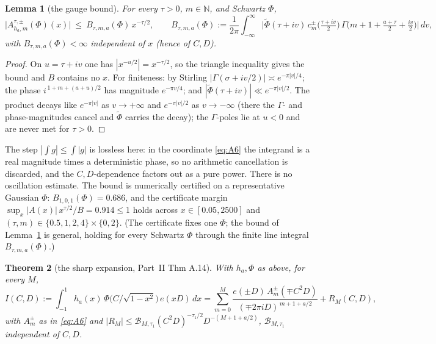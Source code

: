 \documentclass[11pt]{article}
\newtheorem{theorem}{Theorem}
\newtheorem{lemma}[theorem]{Lemma}
\theoremstyle{definition}
\newcommand{\wt}[1]{\widetilde{#1}}
\begin{document}
\begin{lemma}[the gauge bound]\label{lem:mag}
For every $\tau>0$, $m\in\mathbb N$, and Schwartz $\Phi$,
\[
  \big|A^{\tau,\pm}_{h_a,m}(\Phi)(x)\big|\ \le\ B_{\tau,m,a}(\Phi)\,x^{-\tau/2},
  \qquad
  B_{\tau,m,a}(\Phi):=\frac{1}{2\pi}\!\int_{-\infty}^{\infty}\!
     \Big|\wt\Phi(\tau+iv)\,c^\pm_m\!\big(\tfrac{\tau+iv}{2}\big)\,
     \Gamma\!\big(m{+}1{+}\tfrac{a+\tau}{2}{+}\tfrac{iv}{2}\big)\Big|\,dv,
\]
with $B_{\tau,m,a}(\Phi)<\infty$ \emph{independent of $x$} (hence of $C,D$).
\end{lemma}

\begin{proof}
On $u=\tau+iv$ one has $|x^{-u/2}|=x^{-\tau/2}$, so the triangle inequality gives the bound and $B$
contains no $x$. For finiteness: by Stirling $|\Gamma(\sigma+iv/2)|\asymp e^{-\pi|v|/4}$; the phase
$i^{\,1+m+(a+u)/2}$ has magnitude $e^{-\pi v/4}$; and $|\wt\Phi(\tau+iv)|\ll e^{-\pi|v|/2}$. The
product decays like $e^{-\pi|v|}$ as $v\to+\infty$ and $e^{-\pi|v|/2}$ as $v\to-\infty$ (there the
$\Gamma$- and phase-magnitudes cancel and $\wt\Phi$ carries the decay); the $\Gamma$-poles lie at
$u<0$ and are never met for $\tau>0$.
\end{proof}

The step $|\int g|\le\int|g|$ is lossless here: in the coordinate \eqref{eq:A6} the integrand is a
real magnitude times a deterministic phase, so no arithmetic cancellation is discarded, and the
$C,D$-dependence factors out as a pure power. There is no oscillation estimate. The bound is
numerically certified on a representative Gaussian $\Phi$: $B_{1,0,1}(\Phi)=0.686$, and the certificate
margin $\sup_x |A(x)|\,x^{\tau/2}/B=0.914\le1$ holds across $x\in[0.05,2500]$ and
$(\tau,m)\in\{0.5,1,2,4\}\times\{0,2\}$. (The certificate fixes one $\Phi$; the bound of
Lemma~\ref{lem:mag} is general, holding for every Schwartz $\Phi$ through the finite line integral
$B_{\tau,m,a}(\Phi)$.)

\begin{theorem}[the sharp expansion, Part~II Thm A.14]\label{thm:A14}
With $h_a,\Phi$ as above, for every $M$,
\[
  I(C,D):=\int_{-1}^{1}h_a(x)\,\Phi\!\big(C/\sqrt{1-x^2}\big)\,e(xD)\,dx
  =\sum_{m=0}^{M}\frac{e(\pm D)\,A^{\pm}_m(\mp C^2D)}{(\mp 2\pi iD)^{\,m+1+a/2}}+R_M(C,D),
\]
with $A^\pm_m$ as in \eqref{eq:A6} and $|R_M|\le\mathcal B_{M,\tau_1}(C^2D)^{-\tau_1/2}
D^{-(M+1+a/2)}$, $\mathcal B_{M,\tau_1}$ independent of $C,D$.
\end{theorem}
\end{document}
